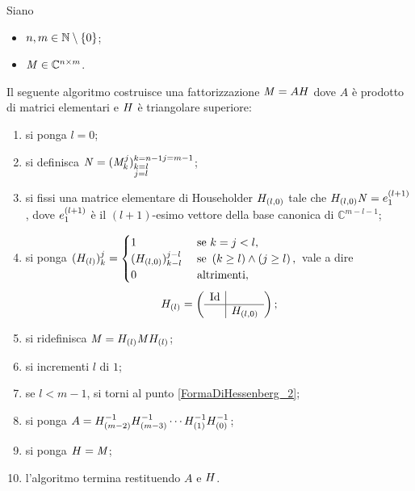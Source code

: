 \begin{Theorem}
  Siano
  \begin{itemize}
    \item $n, m \in \mathbb{N} \setminus \lbrace 0 \rbrace$;
    \item $\mathit{M} \in \mathbb{C}^{n \times m}$.
  \end{itemize}
  Il seguente algoritmo costruisce una fattorizzazione
  $\mathit{M} = A H$ dove $A$ \`e prodotto di matrici
  elementari e $H$ \`e triangolare superiore:
  \begin{enumerate}
    \item\label{FormaDiHessenberg_1} si ponga $l = 0$;
    \item\label{FormaDiHessenberg_2} si definisca
      $\mathit{N} = (\mathit{M}_k^j)_{\substack{k = l\\j= l}}^{\substack{k = n - 1}{j = m - 1}}$;
    \item\label{FormaDiHessenberg_3} si fissi una matrice
      elementare di Householder $H_{(l,0)}$ tale che
      $H_{(l,0)}\mathit{N} = e_1^{(l + 1)}$, dove
      $e_1^{(l + 1)}$ \`e il $(l + 1)$-esimo vettore della base
      canonica di $\mathbb{C}^{m - l - 1}$;
    \item\label{FormaDiHessenberg_4} si ponga
      $(H_{(l)})_k^j =
      \begin{cases}
        1&\text{ se }k = j < l,\\
        (H_{(l,0)})_{k - l}^{j - l}&\text{ se }\left ( k \geq l \right ) \wedge \left ( j \geq l \right ),\\
        0&\text{ altrimenti},
      \end{cases}$
      vale a dire
      \[
        \HouseholderElementaryMatrix_{(l)} =
        \lmatrix
        \begin{array}{c|c}
          \Identity &\\
          \hline
          & \HouseholderElementaryMatrix_{(l,0)}
        \end{array}
        \rmatrix;
      \]
    \item\label{FormaDiHessenberg_5} si ridefinisca
      $\mathit{M} = H_{(l)}\mathit{M}H_{(l)}$;
    \item\label{FormaDiHessenberg_6} si incrementi
      $l$ di $1$;
    \item\label{FormaDiHessenberg_7} se $l < m - 1$, si torni al
      punto \ref{FormaDiHessenberg_2};
    \item\label{FormaDiHessenberg_8} si ponga
      $A = H_{(m - 2)}^{-1}H_{(m - 3)}^{-1}
      \cdots
      H_{(1)}^{-1}H_{(0)}^{-1}$;
    \item\label{FormaDiHessenberg_9} si ponga
      $H = \mathit{M}$;
    \item\label{FormaDiHessenberg_10} l'algoritmo termina restituendo
      $A$ e $H$.
  \end{enumerate}
\end{Theorem}
